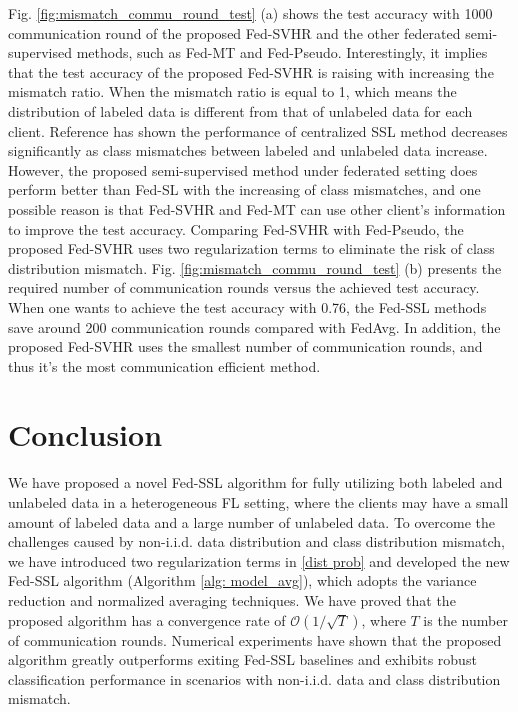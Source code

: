 \documentclass[twoside,journal]{IEEEtran}
\begin{document}
Fig. \ref{fig:mismatch_commu_round_test} (a) shows the test accuracy with 1000 communication round  of the proposed Fed-SVHR and the other federated semi-supervised methods, such as Fed-MT and Fed-Pseudo. Interestingly, it implies that the test accuracy of the proposed Fed-SVHR is raising with increasing the mismatch ratio. When the mismatch ratio is equal to 1, which means the distribution of labeled data is different from that of unlabeled data for each client. Reference \cite{guo2020safe} has shown the performance of centralized SSL method decreases significantly as
class mismatches between labeled and unlabeled data increase.
 However, the proposed semi-supervised method under federated setting does perform better than Fed-SL with the increasing of class mismatches, and one possible reason is  that Fed-SVHR and Fed-MT can use other client's information to improve the test accuracy. Comparing  Fed-SVHR with Fed-Pseudo, the proposed Fed-SVHR uses two regularization terms to eliminate the risk of class distribution mismatch. Fig. \ref{fig:mismatch_commu_round_test} (b) presents the required number of communication rounds versus the achieved test accuracy. When one wants to achieve the test accuracy with 0.76, the Fed-SSL methods  save around 200 communication rounds compared with FedAvg. In addition, the proposed Fed-SVHR uses the smallest number of communication rounds, and thus it's the most communication efficient method.

\section{Conclusion}\label{sec: conc}
We have  proposed a novel Fed-SSL algorithm for fully utilizing both labeled and unlabeled data in a heterogeneous FL setting, where the clients may have a  small amount of labeled data and a large number of unlabeled data. To overcome the challenges caused by non-i.i.d. data distribution and class distribution mismatch, we have introduced two regularization terms in \eqref{dist prob} and developed the new Fed-SSL algorithm (Algorithm \ref{alg: model_avg}), which adopts the variance reduction and normalized averaging techniques.
 We have proved that the proposed algorithm has a convergence rate of $\mathcal{O}(1/\sqrt{T})$, where $T$ is the number of communication rounds. Numerical experiments have  shown that the proposed algorithm greatly outperforms exiting Fed-SSL baselines and exhibits robust classification performance in scenarios with non-i.i.d. data and class distribution mismatch.
\end{document}
